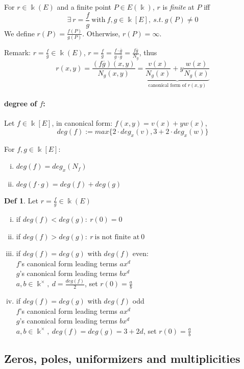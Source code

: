 \documentclass{article}
\theoremstyle{definition}
\newtheorem{definition}{Def}[section]
\begin{document}
For $r\in \Bbbk(E)$ and a finite point $P \in E(\Bbbk)$, $r$ is \emph{finite} at $P$ iff
$$\exists~ r=\frac{f}{g} ~\text{with}~ f,g \in \Bbbk[E],~ s.t.~ g(P) \neq 0$$
We define $r(P)=\frac{f(P)}{g(P)}$. Otherwise, $r(P)=\infty$.

Remark: $r=\frac{f}{g} \in \Bbbk(E)$, $r=\frac{f}{g}=\frac{f \cdot \overline{g}}{g \cdot \overline{g}} = \frac{f \overline{g}}{N_g}$, thus
$$r(x,y)=\frac{ (f \overline{g})(x,y)}{N_g(x,y)} = \underbrace{ \frac{v(x)}{N_g(x)} + y \frac{w(x)}{N_g(x)} }_\text{canonical form of $r(x,y)$}$$

\paragraph{degree of $f$:} Let $f\in \Bbbk[E]$, in canonical form: $f(x,y) = v(x) + y w(x)$,
$$deg(f) := max\{ 2 \cdot deg_x(v), 3+2 \cdot deg_x(w) \}$$

For $f,g \in \Bbbk[E]$:
\begin{enumerate}[i.]
  \item $deg(f) = deg_x(N_f)$
  \item $deg(f \cdot g) = deg(f) + deg(g)$
\end{enumerate}

\begin{definition}
  Let $r=\frac{f}{g} \in \Bbbk(E)$
  \begin{enumerate}[i.]
    \item if $deg(f) < deg(g):~ r(0)=0$
    \item if $deg(f) > deg(g):~ r ~\text{is not finite at}~ 0$
    \item if $deg(f) = deg(g)$ with $deg(f)$ even:\\
      $f$'s canonical form leading terms $ax^d$\\
      $g$'s canonical form leading terms $bx^d$\\
      $a,b \in \Bbbk^\times,~ d=\frac{deg(f)}{2}$, set $r(0)=\frac{a}{b}$
    \item if $deg(f) = deg(g)$ with $deg(f)$ odd\\
      $f$'s canonical form leading terms $ax^d$\\
      $g$'s canonical form leading terms $bx^d$\\
      $a,b \in \Bbbk^\times,~ deg(f)=deg(g)=3+2d$, set $r(0)=\frac{a}{b}$
  \end{enumerate}
\end{definition}

\subsection{Zeros, poles, uniformizers and multiplicities}
\end{document}
